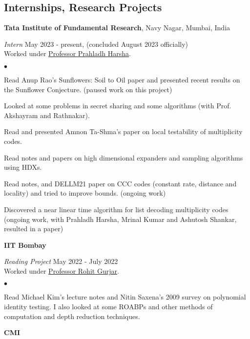 \documentclass[margin,line, 10pt]{res}
\newenvironment{list2}{
  \begin{list}{$\bullet$}{%
      \setlength{\itemsep}{0in}
      \setlength{\parsep}{0in} \setlength{\parskip}{0in}
      \setlength{\topsep}{0in} \setlength{\partopsep}{0in} 
      \setlength{\leftmargin}{0.2in}}}{\end{list}}
\begin{document}
\begin{resume}
\section{\sc Internships, Research Projects}
{\bf Tata Institute of Fundamental Research}, Navy Nagar, Mumbai, India

\vspace{-.3cm}
{\em Intern} \hfill {May 2023 - present, (concluded August 2023 officially)}\\
Worked under \href{https://www.tifr.res.in/~prahladh/}{Professor Prahladh Harsha}.

\vspace*{.05in}  
\begin{list2}
\item Read Anup Rao's Sunflowers: Soil to Oil paper and presented recent results on the Sunflower Conjecture. (paused work on this project)
\item Looked at some problems in secret sharing and some algorithms (with Prof. Akshayram and Rathnakar).
\item Read and presented Amnon Ta-Shma's paper on local testability of multiplicity codes.
\item Read notes and papers on high dimensional expanders and sampling algorithms using HDXs.
\item Read notes, and DELLM21 paper on CCC codes (constant rate, distance and locality) and tried to improve bounds. (ongoing work)
\item Discovered a near linear time algorithm for list decoding multiplicity codes (ongoing work, with Prahladh Harsha, Mrinal Kumar and Ashutosh Shankar, resulted in a paper)
\end{list2}

\eject
{\bf IIT Bombay}

\vspace{-.3cm}
{\em Reading Project} \hfill {May 2022 - July 2022}\\
Worked under \href{https://www.cse.iitb.ac.in/~rgurjar/}{Professor Rohit Gurjar}.

\vspace*{.05in}  
\begin{list2}
\item Read Michael Kim's lecture notes and Nitin Saxena's 2009 survey on polynomial identity testing. I also looked at some ROABPs and other methods of computation and depth reduction techniques.
\end{list2}

{\bf CMI}


\end{resume}
\end{document}
